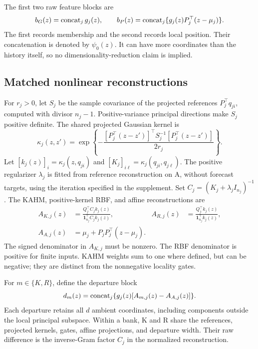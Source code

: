 The first two raw feature blocks are
\begin{equation}
 b_G(z)=\operatorname{concat}_j g_j(z),\qquad
 b_P(z)=\operatorname{concat}_j\{g_j(z)P_j^\top(z-\mu_j)\}.
 \label{eq:position}
\end{equation}
The first records membership and the second records local position. Their concatenation is denoted by $\psi_0(z)$. It can have more coordinates than the history itself, so no dimensionality-reduction claim is implied.

\subsection{Matched nonlinear reconstructions}
For $r_j>0$, let $S_j$ be the sample covariance of the projected references $P_j^\top q_{ji}$, computed with divisor $n_j-1$. Positive-variance principal directions make $S_j$ positive definite. The shared projected Gaussian kernel is
\begin{equation}
 \kappa_j(z,z')=\exp\left\{-\frac{[P_j^\top(z-z')]^\top S_j^{-1}[P_j^\top(z-z')]}{2r_j}\right\}.
 \label{eq:kernel}
\end{equation}
Let $[k_j(z)]_i=\kappa_j(z,q_{ji})$ and $[K_j]_{i\ell}=\kappa_j(q_{ji},q_{j\ell})$. The positive regularizer $\lambda_j$ is fitted from reference reconstruction on A, without forecast targets, using the iteration specified in the supplement. Set $C_j=(K_j+\lambda_j I_{n_j})^{-1}$. The KAHM, positive-kernel RBF, and affine reconstructions are
\begin{align}
 A_{K,j}(z)&=\frac{Q_j^\top C_j k_j(z)}{\mathbf1_{n_j}^\top C_j k_j(z)},&
 A_{R,j}(z)&=\frac{Q_j^\top k_j(z)}{\mathbf1_{n_j}^\top k_j(z)},\label{eq:reconstructions}\\
 A_{A,j}(z)&=\mu_j+P_jP_j^\top(z-\mu_j).\nonumber
\end{align}
The signed denominator in $A_{K,j}$ must be nonzero. The RBF denominator is positive for finite inputs. KAHM weights sum to one where defined, but can be negative; they are distinct from the nonnegative locality gates.

For $m\in\{K,R\}$, define the departure block
\begin{equation}
 d_m(z)=\operatorname{concat}_j\{g_j(z)[A_{m,j}(z)-A_{A,j}(z)]\}.
 \label{eq:departures}
\end{equation}
Each departure retains all $d$ ambient coordinates, including components outside the local principal subspace. Within a bank, K and R share the references, projected kernels, gates, affine projections, and departure width. Their raw difference is the inverse-Gram factor $C_j$ in the normalized reconstruction.

